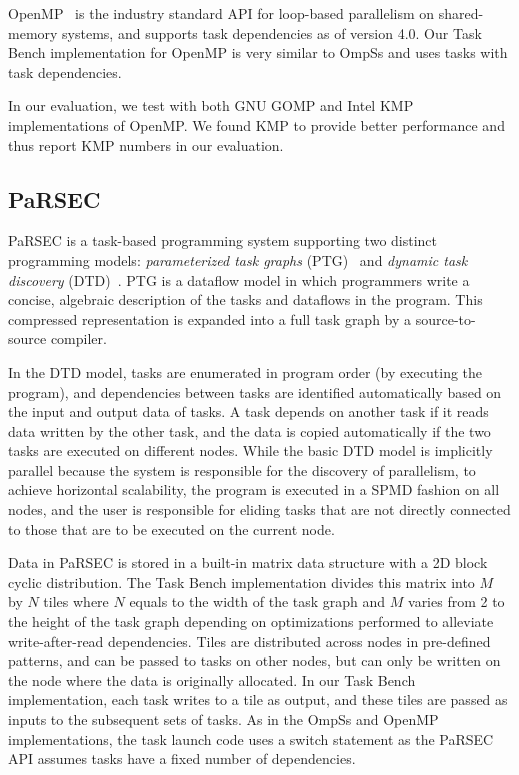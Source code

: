 OpenMP~\cite{OpenMPSpec40} is the industry standard API for loop-based
parallelism on shared-memory systems, and supports task dependencies as of version 4.0. Our Task Bench implementation
for OpenMP is very similar to OmpSs and uses tasks with
task dependencies.

In our evaluation, we test with both GNU GOMP and Intel KMP
implementations of OpenMP. We found KMP to provide better performance
and thus report KMP numbers in our evaluation.


\subsection{PaRSEC}

PaRSEC is a task-based programming system supporting two distinct
programming models: \emph{parameterized task graphs}
(PTG)~\cite{PARSEC13} and \emph{dynamic task discovery}
(DTD)~\cite{PARSEC_DTD}.  PTG is a dataflow model in which programmers
write a concise, algebraic description of the tasks and dataflows in
the program. This compressed representation is expanded into a full
task graph by a source-to-source compiler.

In the DTD model, tasks are enumerated in program order (by
executing the program), and dependencies between tasks are
identified automatically based on the input and output data of tasks. 
A task depends on another task if it reads data written by the other task,
and the data is copied automatically if the two tasks are executed on
different nodes. While the basic DTD model is implicitly parallel
because the system is responsible for the discovery of parallelism, to
achieve horizontal scalability, the program is executed in a
SPMD fashion on all nodes, and the user is responsible for eliding
tasks that are not directly connected to those that are to be executed
on the current node.

Data in PaRSEC is stored in a built-in matrix data structure with a 2D
block cyclic distribution.  The Task Bench implementation divides this
matrix into $M$ by $N$ tiles where $N$ equals to the width of the task
graph and $M$ varies from 2 to the height of the task graph depending
on optimizations performed to alleviate write-after-read dependencies.
Tiles are distributed across nodes in pre-defined patterns,
and can be passed to tasks on other nodes, but
can only be written on the node where the data is originally
allocated. In our Task Bench implementation, each task writes to a
tile as output, and these tiles are passed as inputs to the
subsequent sets of tasks. As in the OmpSs and OpenMP implementations,
the task launch code uses a switch statement as the PaRSEC API assumes
tasks have a fixed number of dependencies.

